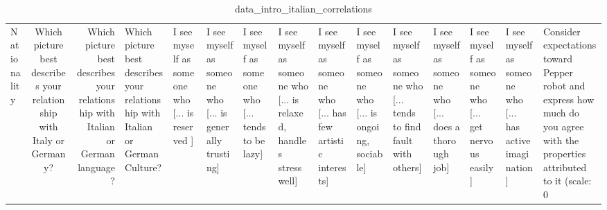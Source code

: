 \begin{table}
\caption{data_intro_italian_correlations}
\label{tab:data_intro_italian_correlations}
\begin{tabular}{lcr}
\toprule
Nationality & Which picture best describes your relationship with Italy or Germany? & Which picture best describes your relationship with Italian or German language? & Which picture best describes your relationship with Italian or German Culture? & I see myself as someone who  [... is reserved ] & I see myself as someone who  [... is generally trusting] & I see myself as someone who  [... tends to be lazy] & I see myself as someone who  [... is relaxed, handles stress well] & I see myself as someone who  [... has few artistic interests] & I see myself as someone who  [... is ongoing, sociable] & I see myself as someone who  [... tends to find fault with others] & I see myself as someone who  [... does a thorough job] & I see myself as someone who  [... get nervous easily] & I see myself as someone who  [... has active imagination] & Consider expectations toward Pepper robot and express how much do you agree with the properties attributed to it (scale: 0%
\end{tabular}
\end{table}
